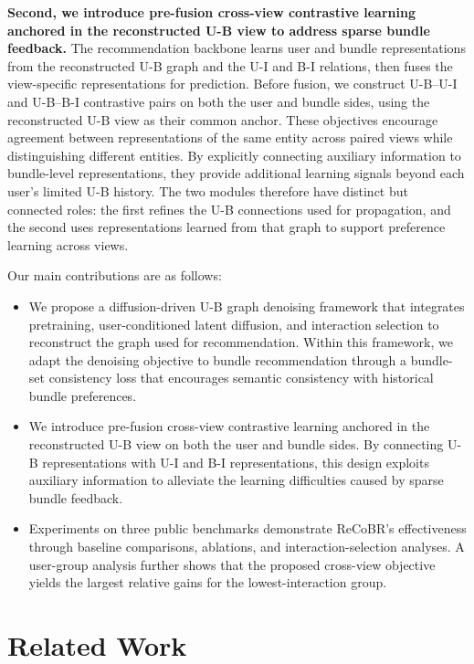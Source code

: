 \documentclass[letterpaper]{article}
\begin{document}
\textbf{Second, we introduce pre-fusion cross-view contrastive learning anchored in the reconstructed U-B view to address sparse bundle feedback.} The recommendation backbone learns user and bundle representations from the reconstructed U-B graph and the U-I and B-I relations, then fuses the view-specific representations for prediction. Before fusion, we construct U-B--U-I and U-B--B-I contrastive pairs on both the user and bundle sides, using the reconstructed U-B view as their common anchor. These objectives encourage agreement between representations of the same entity across paired views while distinguishing different entities. By explicitly connecting auxiliary information to bundle-level representations, they provide additional learning signals beyond each user's limited U-B history. The two modules therefore have distinct but connected roles: the first refines the U-B connections used for propagation, and the second uses representations learned from that graph to support preference learning across views.

Our main contributions are as follows:

\begin{itemize}
\item We propose a diffusion-driven U-B graph denoising framework that integrates pretraining, user-conditioned latent diffusion, and interaction selection to reconstruct the graph used for recommendation. Within this framework, we adapt the denoising objective to bundle recommendation through a bundle-set consistency loss that encourages semantic consistency with historical bundle preferences.
\item We introduce pre-fusion cross-view contrastive learning anchored in the reconstructed U-B view on both the user and bundle sides. By connecting U-B representations with U-I and B-I representations, this design exploits auxiliary information to alleviate the learning difficulties caused by sparse bundle feedback.
\item Experiments on three public benchmarks demonstrate ReCoBR's effectiveness through baseline comparisons, ablations, and interaction-selection analyses. A user-group analysis further shows that the proposed cross-view objective yields the largest relative gains for the lowest-interaction group.
\end{itemize}


\section{Related Work}
\end{document}
